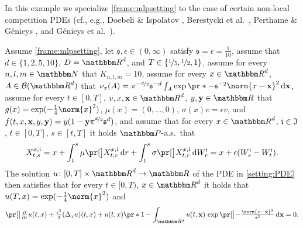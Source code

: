\begin{example}

	\label{exampleMLP:nonlocal_comp}
	In this example we specialize \cref{frame:mlpsetting} to the case of certain non-local competition PDEs (cf., e.g., Doebeli \& Ispolatov \cite{Doebeli2010}, Berestycki et al.~\cite{Berestycki2009b}, Perthame \& Génieys \cite{Perthame2007}, and Génieys et al.~\cite{Genieys2006a}).

	Assume 
		\cref{frame:mlpsetting},
	let
		$\mathfrak s,\epsilon\in(0,\infty)$
	satisfy 
		$\mathfrak{s} = \epsilon = \tfrac{1}{10}$,
	assume that
		$d\in\{1,2,5,10\}$,
		$D = \R^d$, and
		$T\in\{\nicefrac{1}{5},\nicefrac{1}{2},1\}$,
	assume for every 
		$n,l,m\in \N$ 
	that
		$K_{n,l,m} = 10$,
	assume for every
		$x \in \R^d$,
		$A \in \mathcal{B}(\R^d)$
	that
		$\nu_x(A) = \pi^{-\nicefrac{d}{2}}\mathfrak{s}^{-d}\int_A \exp\pr*{-\mathfrak{s}^{-2}\norm{x - \mathbf{x}}^2}\,\diff\mathbf{x}$,
	assume for every 
		$t \in [0,T]$,
		$v,x,\mathbf{x} \in \R^d$,
		$y,\mathbf{y} \in \R$
	that
		$g(x)= \exp (- \tfrac{1}{4}\norm{x}^2)$,
		$\mu(x)=(0,\dots,0)$,
		$\sigma(x) v = \epsilon v$, and
		$f(t,x,\mathbf{x},y,\mathbf{y})= y(1 -\mathbf{y}\pi^{\nicefrac{d}{2}}\mathfrak{s}^d)$,
	and	assume that for every 
		$x\in \R^{d}$, 
		$\mathfrak{i} \in \mathfrak{I}$, 
		$t\in [0,T]$, 
		$s\in [t,T]$ 
	it holds $\P$-a.s.\ that
	\begin{equation}
		X^{x,\dindex}_{t,s} 
		= 
		x + \int_{t}^{s} \mu\bpr{X^{x,\dindex}_{t,r}} \, \diff r + \int^{s}_{t} \sigma \bpr{X^{x,\dindex}_{t,r}} \, \diff W^{\dindex}_{r}
		=
		x+\epsilon(W^\dindex_s-W^\dindex_t)
		.
	\end{equation}
	The solution 
		$u\colon[0,T]\times \R^d \to \R$ 
		of the PDE in \eqref{setting:PDE} then satisfies that
	for every
		$t\in [0,T)$, 
		$x\in\R^d$
	it holds that
		$u(T,x) = \exp (-\tfrac{1}{4}\norm{x}^2)$ and
		\begin{equation}
			\label{eqMLP:nonlocalcompet}
			\bpr{\tfrac{\partial }{\partial t}u} (t,x) 
			+
			\tfrac{\epsilon^2}{2}(\Delta_x u) (t,x) 
			+ 
			u(t,x)\pr*{1 - \int_{\R^d} u(t,\mathbf{x})\,\exp\bpr{-\tfrac{\norm{x-\mathbf{x}}^2}{\mathfrak{s}^2}} \, \diff\mathbf{x} }
			=
			0
			.
	\end{equation}
\end{example}

